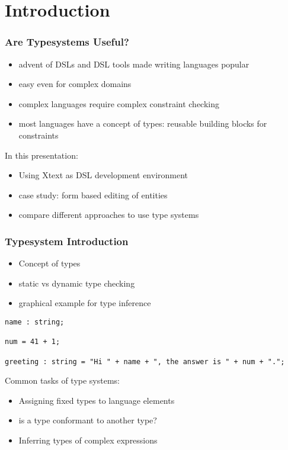 \section{Introduction}

\begin{frame}
  \frametitle{Are Typesystems Useful?}

\begin{itemize}
  \item advent of DSLs and DSL tools made writing languages popular
  \item easy even for complex domains
  \item complex languages require complex constraint checking
  \item most languages have a concept of types: reusable building blocks for
  constraints
\end{itemize}

In this presentation:
\begin{itemize}
  \item Using Xtext as DSL development environment
  \item case study: form based editing of entities
  \item compare different approaches to use type systems
\end{itemize}


\end{frame}

\begin{frame}
  \frametitle{Typesystem Introduction}
  \begin{itemize}
    \item Concept of types
    \item static vs dynamic type checking
  \end{itemize}

  \begin{itemize}
    \item graphical example for type inference
   \end{itemize}

\begin{verbatim}
name : string;

num = 41 + 1;

greeting : string = "Hi " + name + ", the answer is " + num + ".";
\end{verbatim}

Common tasks of type systems:

\begin{itemize}
  \item Assigning fixed types to language elements
  \item is a type conformant to another type?
  \item Inferring types of complex expressions
\end{itemize}

\end{frame}

